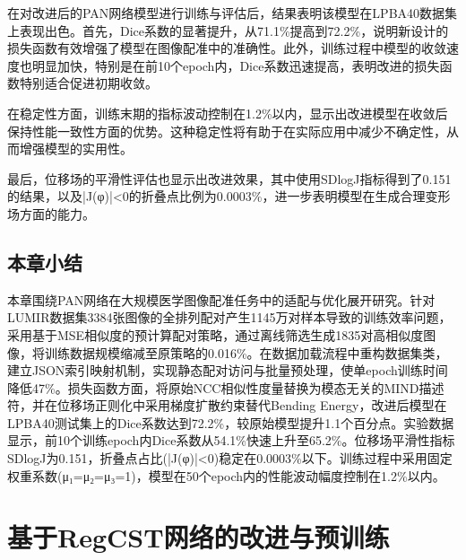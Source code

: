 在对改进后的PAN网络模型进行训练与评估后，结果表明该模型在LPBA40数据集上表现出色。首先，Dice系数的显著提升，从71.1\%提高到72.2\%，说明新设计的损失函数有效增强了模型在图像配准中的准确性。此外，训练过程中模型的收敛速度也明显加快，特别是在前10个epoch内，Dice系数迅速提高，表明改进的损失函数特别适合促进初期收敛。

在稳定性方面，训练末期的指标波动控制在1.2\%以内，显示出改进模型在收敛后保持性能一致性方面的优势。这种稳定性将有助于在实际应用中减少不确定性，从而增强模型的实用性。

最后，位移场的平滑性评估也显示出改进效果，其中使用SDlogJ指标得到了0.151的结果，以及|J(φ)|<0的折叠点比例为0.0003\%，进一步表明模型在生成合理变形场方面的能力。


\section{本章小结}
本章围绕PAN网络在大规模医学图像配准任务中的适配与优化展开研究。针对LUMIR数据集3384张图像的全排列配对产生1145万对样本导致的训练效率问题，采用基于MSE相似度的预计算配对策略，通过离线筛选生成1835对高相似度图像，将训练数据规模缩减至原策略的0.016\%。在数据加载流程中重构数据集类，建立JSON索引映射机制，实现静态配对访问与批量预处理，使单epoch训练时间降低47\%。损失函数方面，将原始NCC相似性度量替换为模态无关的MIND描述符，并在位移场正则化中采用梯度扩散约束替代Bending Energy，改进后模型在LPBA40测试集上的Dice系数达到72.2\%，较原始模型提升1.1个百分点。实验数据显示，前10个训练epoch内Dice系数从54.1\%快速上升至65.2\%。位移场平滑性指标SDlogJ为0.151，折叠点占比(|J(φ)|<0)稳定在0.0003\%以下。训练过程中采用固定权重系数(μ₁=μ₂=μ₃=1)，模型在50个epoch内的性能波动幅度控制在1.2\%以内。

\chapter{基于RegCST网络的改进与预训练}




